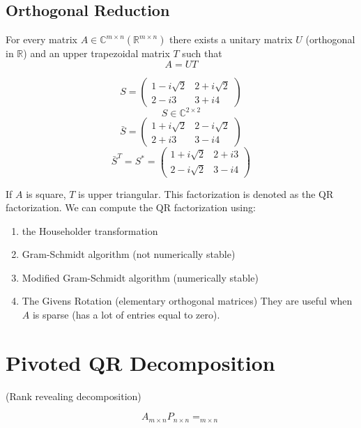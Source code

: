 \subsection{Orthogonal Reduction}
For every matrix $A \in \mathbb{C}^{m \times n} (\mathbb{R}^{m \times n})$ there exists a unitary matrix $U$
(orthogonal in $\mathbb{R}$) and an upper trapezoidal matrix $T$ such that
$$A = UT$$

\begin{equation*}
S = \begin{pmatrix}
1 - i\sqrt{2} & 2+i\sqrt{2} \\
2 - i3 & 3+i4
\end{pmatrix}
\end{equation*}
\begin{equation*}
S \in \mathbb{C}^{2 \times 2}
\end{equation*}
\begin{equation*}
\bar{S} = \begin{pmatrix}
1+i\sqrt{2} & 2-i\sqrt{2} \\
2+i3 & 3-i4
\end{pmatrix}
\end{equation*}
\begin{equation*}
\bar{S}^T = S^* = \begin{pmatrix}
1+i\sqrt{2} & 2+i3 \\
2-i\sqrt{2} & 3-i4
\end{pmatrix}
\end{equation*}

If $A$ is square, $T$ is upper triangular. This factorization is denoted as the QR factorization. We can compute the QR factorization using:
\begin{enumerate}
\item the Householder transformation
\item Gram-Schmidt algorithm (not numerically stable)
\item Modified Gram-Schmidt algorithm (numerically stable)
\item The Givens Rotation (elementary orthogonal matrices)
    They are useful when \( A \) is sparse (has a lot of entries equal to zero).
\end{enumerate}

\section{Pivoted QR Decomposition}
(Rank revealing decomposition)

\[
A_{m \times n} P_{n \times n} = _{m \times n}
\]


